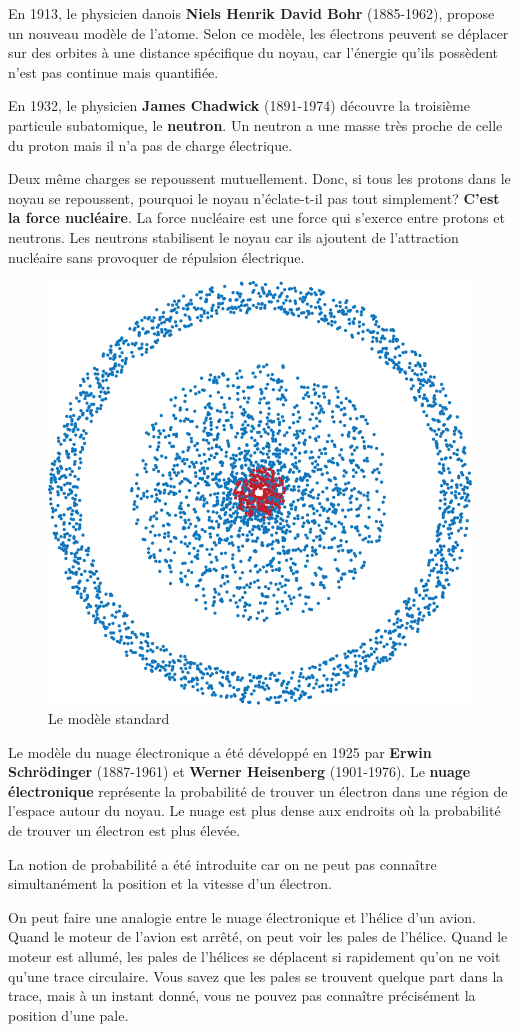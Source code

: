 \documentclass[
  11pt,
  a4paper,
  openany]{book}
\begin{document}
En 1913, le physicien danois \textbf{Niels Henrik David Bohr} (1885-1962), propose un nouveau modèle de l'atome. Selon ce modèle, les électrons peuvent se déplacer sur des orbites à une distance spécifique du noyau, car l'énergie qu'ils possèdent n'est pas continue mais quantifiée.

En 1932, le physicien \textbf{James Chadwick} (1891-1974) découvre la troisième particule subatomique, le \textbf{neutron}. Un neutron a une masse très proche de celle du proton mais il n'a pas de charge électrique.

Deux même charges se repoussent mutuellement. Donc, si tous les protons dans le noyau se repoussent, pourquoi le noyau n'éclate-t-il pas tout simplement? \textbf{C'est la force nucléaire}. La force nucléaire est une force qui s'exerce entre protons et neutrons. Les neutrons stabilisent le noyau car ils ajoutent de l'attraction nucléaire sans provoquer de répulsion électrique.

\begin{figure}

{\centering \includegraphics[width=0.25\linewidth]{images/modeles-atomiques-cloud} 

}

\caption{Le modèle standard}\label{fig:modeles-atomiques-cloud}
\end{figure}

Le modèle du nuage électronique a été développé en 1925 par \textbf{Erwin Schrödinger} (1887-1961) et \textbf{Werner Heisenberg} (1901-1976). Le \textbf{nuage électronique} représente la probabilité de trouver un électron dans une région de l'espace autour du noyau. Le nuage est plus dense aux endroits où la probabilité de trouver un électron est plus élevée.

La notion de probabilité a été introduite car on ne peut pas connaître simultanément la position et la vitesse d'un électron.

On peut faire une analogie entre le nuage électronique et l'hélice d'un avion. Quand le moteur de l'avion est arrêté, on peut voir les pales de l'hélice. Quand le moteur est allumé, les pales de l'hélices se déplacent si rapidement qu'on ne voit qu'une trace circulaire. Vous savez que les pales se trouvent quelque part dans la trace, mais à un instant donné, vous ne pouvez pas connaître précisément la position d'une pale.
\end{document}
